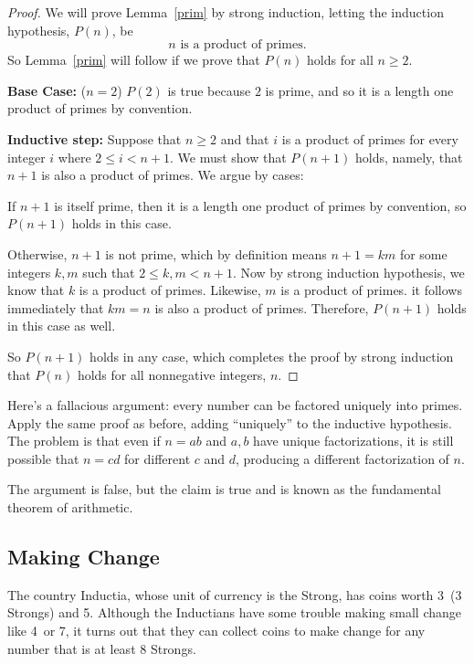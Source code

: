 \begin{proof}

We will prove Lemma~\ref{prim} by strong induction, letting the induction
hypothesis, $P(n)$, be
\[
n \text{ is a product of primes}.
\]
So Lemma~\ref{prim} will follow if we prove that $P(n)$ holds for all $n
\geq 2$.

\textbf{Base Case:} ($n=2$) $P(2)$ is true because $2$ is prime, and so it is
a length one product of primes by convention.

\textbf{Inductive step:} Suppose that $n \geq 2$ and that $i$ is a product
of primes for every integer $i$ where $2 \leq i < n+1$.  We must show that
$P(n+1)$ holds, namely, that $n+1$ is also a product of primes.  We argue
by cases:

If $n+1$ is itself prime, then it is a length one product of primes by
convention, so $P(n+1)$ holds in this case.

Otherwise, $n + 1$ is not prime, which by definition means $n+1 = km$ for
some integers $k,m$ such that $2 \leq k,m < n+1$.  Now by strong induction
hypothesis, we know that $k$ is a product of primes.  Likewise,
$m$ is a product of primes.  it follows immediately that $km = n$ is
also a product of primes.  Therefore, $P(n+1)$ holds in this case as well.

So $P(n+1)$ holds in any case, which completes the proof by strong
induction that $P(n)$ holds for all nonnegative integers, $n$.

\end{proof}

\begin{editingnotes}
Here's a fallacious argument: every number can be factored uniquely
into primes.  Apply the same proof as before, adding ``uniquely'' to
the inductive hypothesis.  The problem is that even if $n=ab$ and
$a,b$ have unique factorizations, it is still possible that $n=cd$ for
different $c$ and $d$, producing a different factorization of $n$.

The argument is false, but the claim is true and is known as the
fundamental theorem of arithmetic.

\end{editingnotes}

\subsection{Making Change}

The country Inductia, whose unit of currency is the Strong, has coins
worth 3\sg\ (3 Strongs) and 5\sg.  Although the Inductians have some
trouble making small change like 4\sg\ or 7\sg, it turns out that they
can collect coins to make change for any number that is at least 8
Strongs.

